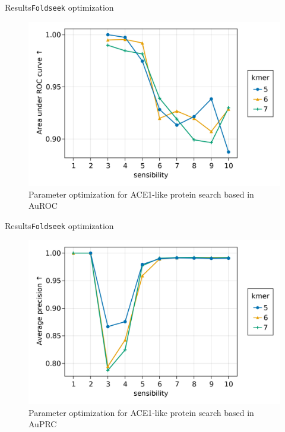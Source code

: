 \documentclass{beamer}
\begin{document}
\begin{frame}{Results}{\texttt{Foldseek} optimization}
	\begin{figure}
	\includegraphics[width=0.8\linewidth]{figures/AuROC_optimization.png}
	\caption{Parameter optimization for ACE1-like protein search based in AuROC}
	\end{figure}
\end{frame}

\begin{frame}{Results}{\texttt{Foldseek} optimization}
	\begin{figure}
	\includegraphics[width=0.8\linewidth]{figures/AuPRC_optimization.png}
	\caption{Parameter optimization for ACE1-like protein search based in AuPRC}
	\end{figure}
\end{frame}
\end{document}
